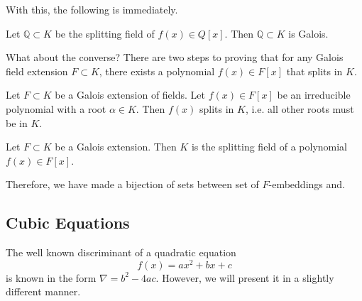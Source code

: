   With this, the following is immediately. 

  \begin{theorem} 
    Let $\mathbb{Q} \subset K$ be the splitting field of $f(x) \in Q[x]$. Then $\mathbb{Q} \subset K$ is Galois. 
  \end{theorem}

  What about the converse? There are two steps to proving that for any Galois field extension $F \subset K$, there exists a polynomial $f(x) \in F[x]$ that splits in $K$. 

  \begin{lemma} 
    Let $F \subset K$ be a Galois extension of fields. Let $f(x) \in F[x]$ be an irreducible polynomial with a root $\alpha \in K$. Then $f(x)$ splits in $K$, i.e. all other roots must be in $K$.  
  \end{lemma} 

  \begin{theorem}
    Let $F \subset K$ be a Galois extension. Then $K$ is the splitting field of a polynomial $f(x) \in F[x]$. 
  \end{theorem}

  Therefore, we have made a bijection of sets between set of $F$-embeddings and.  


  \begin{theorem}
    
  \end{theorem}


\subsection{Cubic Equations}

  The well known discriminant of a quadratic equation 
  \begin{equation}
    f(x) = ax^2 + bx + c
  \end{equation}
  is known in the form $\nabla = b^2 - 4ac$. However, we will present it in a slightly different manner. 

